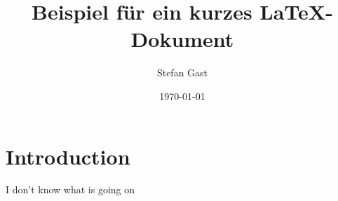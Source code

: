 \documentclass{scrartcl}
\title{Beispiel für ein kurzes \LaTeX-Dokument}
\author{Stefan Gast}
\date{\today}
\begin{document}


	\section{Introduction}
	
		I don't know what is going on

	
\end{document}

